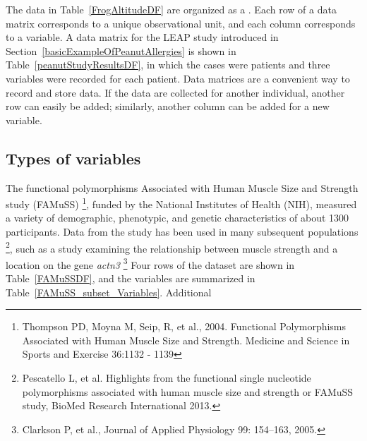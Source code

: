 \begin{doublespace}
The data in Table~\ref{FrogAltitudeDF} are organized as a . Each row of a data matrix corresponds to a unique observational unit, and each column corresponds to a variable. A data matrix for the LEAP study introduced in Section~\ref{basicExampleOfPeanutAllergies} is shown in Table~\vref{peanutStudyResultsDF}, in which the cases were patients and three variables were recorded for each patient. Data matrices are a convenient way to record and store data. If the data are collected for another individual, another row can easily be added; similarly, another column can be added for a new variable.



\subsection{Types of variables}
\label{variableTypes}


The functional polymorphisms Associated with Human Muscle Size and Strength study (FAMuSS) \footnote{Thompson PD, Moyna M, Seip, R, et al., 2004.  Functional Polymorphisms Associated with Human Muscle Size and Strength.  Medicine and Science in Sports and Exercise 36:1132 - 1139}, funded by the National Institutes of Health (NIH), measured a variety of demographic, phenotypic, and genetic characteristics of about 1300 participants. Data from the study has been used in many subsequent populations \footnote{Pescatello L, et al. Highlights from the functional single nucleotide polymorphisms associated with human muscle size and strength or FAMuSS study, BioMed Research International 2013.}, such as a study examining the relationship between muscle strength and a location on the gene \textsl{actn3} \footnote{Clarkson P, et al., Journal of Applied Physiology 99: 154–163, 2005.} Four rows of the  dataset are shown in Table~\ref{FAMuSSDF}, and the variables are summarized in Table~\ref{FAMuSS_subset_Variables}.  Additional 



\end{doublespace}
